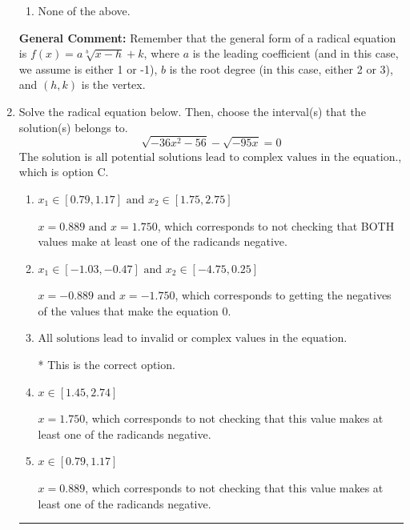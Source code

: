 \documentclass{extbook}[14pt]
\newcommand{\litem}[1]{\item #1

\rule{\textwidth}{0.4pt}}
\begin{document}
\begin{enumerate}
{\begin{enumerate}[label=\Alph*.]
\item None of the above.\end{enumerate}
\textbf{General Comment:} Remember that the general form of a radical equation is $ f(x) = a \sqrt[b]{x - h} + k $, where $a$ is the leading coefficient (and in this case, we assume is either 1 or -1), $b$ is the root degree (in this case, either 2 or 3), and $(h, k)$ is the vertex.
}
\litem{
Solve the radical equation below. Then, choose the interval(s) that the solution(s) belongs to.
\[ \sqrt{-36 x^2 - 56} - \sqrt{-95 x} = 0 \]The solution is \( \text{all potential solutions lead to complex values in the equation.} \), which is option C.\begin{enumerate}[label=\Alph*.]
\item \( x_1 \in [0.79, 1.17] \text{ and } x_2 \in [1.75,2.75] \)

$x = 0.889 \text{ and } x = 1.750$, which corresponds to not checking that BOTH values make at least one of the radicands negative.
\item \( x_1 \in [-1.03, -0.47] \text{ and } x_2 \in [-4.75,0.25] \)

$x = -0.889 \text{ and } x = -1.750$, which corresponds to getting the negatives of the values that make the equation 0.
\item \( \text{All solutions lead to invalid or complex values in the equation.} \)

* This is the correct option.
\item \( x \in [1.45,2.74] \)

$x = 1.750$, which corresponds to not checking that this value makes at least one of the radicands negative.
\item \( x \in [0.79,1.17] \)

$x = 0.889$, which corresponds to not checking that this value makes at least one of the radicands negative.
\end{enumerate}

}
\end{enumerate}
\end{document}

